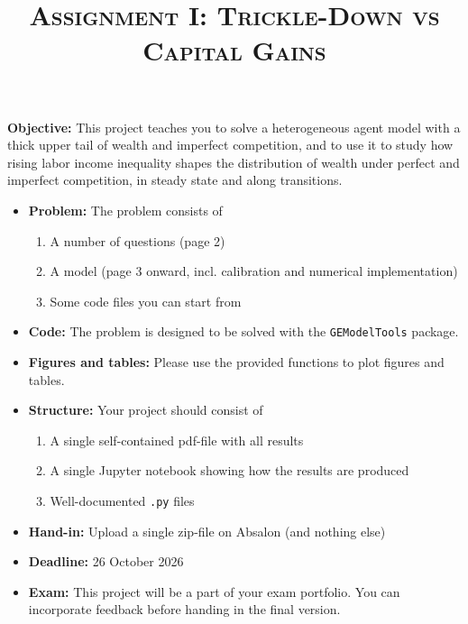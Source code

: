 \documentclass[12pt]{article}
\date{}
\author{}
\begin{document}
\title{\textsc{Assignment I: Trickle-Down vs Capital Gains}}
\maketitle
\vspace{-3mm}\thispagestyle{empty}

\textbf{Objective:} This project teaches you to solve a heterogeneous agent model with a thick upper tail of wealth and imperfect competition, and to use it to study how rising labor income inequality shapes the distribution of wealth under perfect and imperfect competition, in steady state and along transitions.
\begin{itemize}
\item \textbf{Problem:} The problem consists of
\begin{enumerate}
\item A number of questions (page 2)
\item A model (page 3 onward, incl. calibration and numerical implementation)
\item Some code files you can start from
\end{enumerate}
\item \textbf{Code:} The problem is designed to be solved with the \texttt{GEModelTools} package.
\item \textbf{Figures and tables:} Please use the provided functions to plot figures and tables.
\item \textbf{Structure:} Your project should consist of
\begin{enumerate}
\item A single self-contained pdf-file with all results
\item A single Jupyter notebook showing how the results are produced
\item Well-documented \texttt{.py} files
\end{enumerate}
\item \textbf{Hand-in:} Upload a single zip-file on Absalon (and nothing else)
\item \textbf{Deadline:} 26 October 2026
\item \textbf{Exam:} This project will be a part of your exam portfolio.
You can incorporate feedback before handing in the final version.
\end{itemize}

\newpage



\newpage
\end{document}

